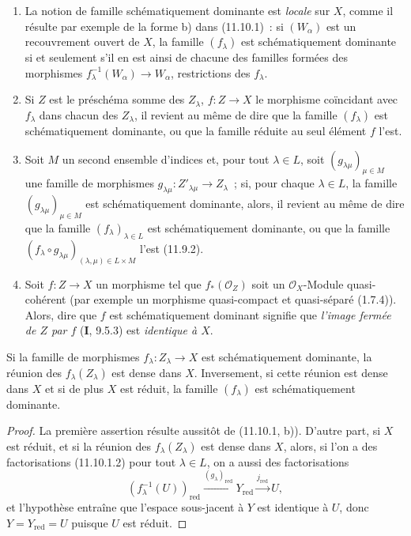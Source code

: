 \begin{remarks}[11.10.3]
\label{IV.11.10.3-fr}
\begin{enumerate}[label=(\roman*)]
  \item La notion de famille schématiquement dominante est \emph{locale} sur
  $X$, comme il résulte par exemple de la forme b) dans (11.10.1)~: si
  $(W_\alpha)$ est un recouvrement ouvert de $X$, la famille $(f_\lambda)$ est
  schématiquement dominante si et seulement s'il en est ainsi de chacune des
  familles formées des morphismes
  $f_\lambda^{-1}(W_\alpha)\to W_\alpha$, restrictions des $f_\lambda$.
  \item Si $Z$ est le préschéma somme des $Z_\lambda$, $f:Z\to X$ le morphisme
  coïncidant avec $f_\lambda$ dans chacun des $Z_\lambda$, il revient au même
  de dire que la famille $(f_\lambda)$ est schématiquement dominante, ou que
  la famille réduite au seul élément $f$ l'est.
  \item Soit $M$ un second ensemble d'indices et, pour tout $\lambda\in L$,
  soit $(g_{\lambda\mu})_{\mu\in M}$ une famille de morphismes
  $g_{\lambda\mu}:Z'_{\lambda\mu}\to Z_\lambda$~; si, pour chaque
  $\lambda\in L$, la famille $(g_{\lambda\mu})_{\mu\in M}$ est
  schématiquement dominante, alors, il revient au même de dire que la famille
  $(f_\lambda)_{\lambda\in L}$ est schématiquement dominante, ou que la
  famille
  $(f_\lambda\circ g_{\lambda\mu})_{(\lambda,\mu)\in L\times M}$ l'est
  (11.9.2).
  \item Soit $f:Z\to X$ un morphisme tel que $f_*(\mathcal O_Z)$ soit un
  $\mathcal O_X$-Module quasi-cohérent (par exemple un morphisme quasi-compact
  et quasi-séparé (1.7.4)). Alors, dire que $f$ est schématiquement dominant
  signifie que \emph{l'image fermée de $Z$ par $f$} ($\mathbf I$, 9.5.3) est
  \emph{identique à $X$}.
\end{enumerate}
\end{remarks}

\begin{proposition}[11.10.4]
\label{IV.11.10.4-fr}
Si la famille de morphismes $f_\lambda:Z_\lambda\to X$ est schématiquement
dominante, la réunion des $f_\lambda(Z_\lambda)$ est dense dans $X$.
Inversement, si cette réunion est dense dans $X$ et si de plus $X$ est réduit,
la famille $(f_\lambda)$ est schématiquement dominante.
\end{proposition}

\begin{proof}
La première assertion résulte aussitôt de (11.10.1, b)). D'autre part, si $X$
est réduit, et si la réunion des $f_\lambda(Z_\lambda)$ est dense dans $X$,
alors, si l'on a des factorisations (11.10.1.2) pour tout $\lambda\in L$, on a
aussi des factorisations
\[
(f_\lambda^{-1}(U))_{\mathrm{red}}
\xrightarrow{(g_\lambda)_{\mathrm{red}}}Y_{\mathrm{red}}
\xrightarrow{j_{\mathrm{red}}}U,
\]
et l'hypothèse entraîne que l'espace sous-jacent à $Y$ est identique à $U$,
donc $Y=Y_{\mathrm{red}}=U$ puisque $U$ est réduit.
\end{proof}

